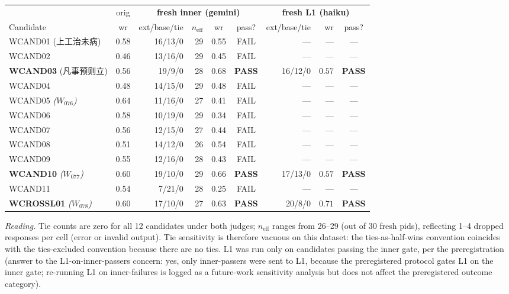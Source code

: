 \documentclass{article}
\begin{document}
\begin{CJK*}{UTF8}{gbsn}
\begin{center}\scriptsize
\begin{tabular}{l c r r c c r r c}
  \toprule
  & orig & \multicolumn{4}{c}{\textbf{fresh inner (gemini)}} & \multicolumn{3}{c}{\textbf{fresh L1 (haiku)}} \\
  \cmidrule(lr){3-6} \cmidrule(lr){7-9}
  Candidate & wr & ext/base/tie & \(n_{\text{eff}}\) & wr & pass? & ext/base/tie & wr & pass? \\
  \midrule
  WCAND01 (上工治未病)        & 0.58 & 16/13/0 & 29 & 0.55 & FAIL &  ---    & ---  & --- \\
  WCAND02                     & 0.46 & 13/16/0 & 29 & 0.45 & FAIL &  ---    & ---  & --- \\
  \textbf{WCAND03} (凡事预则立) & 0.56 & 19/9/0  & 28 & \(\mathbf{0.68}\) & \textbf{PASS} & 16/12/0 & \(\mathbf{0.57}\) & \textbf{PASS} \\
  WCAND04                     & 0.48 & 14/15/0 & 29 & 0.48 & FAIL &  ---    & ---  & --- \\
  WCAND05 \emph{(\(W_{076}\))} & 0.64 & 11/16/0 & 27 & 0.41 & FAIL &  ---    & ---  & --- \\
  WCAND06                     & 0.58 & 10/19/0 & 29 & 0.34 & FAIL &  ---    & ---  & --- \\
  WCAND07                     & 0.56 & 12/15/0 & 27 & 0.44 & FAIL &  ---    & ---  & --- \\
  WCAND08                     & 0.51 & 14/12/0 & 26 & 0.54 & FAIL &  ---    & ---  & --- \\
  WCAND09                     & 0.55 & 12/16/0 & 28 & 0.43 & FAIL &  ---    & ---  & --- \\
  \textbf{WCAND10} \emph{(\(W_{077}\))} & 0.60 & 19/10/0 & 29 & \(\mathbf{0.66}\) & \textbf{PASS} & 17/13/0 & \(\mathbf{0.57}\) & \textbf{PASS} \\
  WCAND11                     & 0.54 & 7/21/0  & 28 & 0.25 & FAIL &  ---    & ---  & --- \\
  \textbf{WCROSSL01} \emph{(\(W_{078}\))} & 0.60 & 17/10/0 & 27 & \(\mathbf{0.63}\) & \textbf{PASS} & 20/8/0 & \(\mathbf{0.71}\) & \textbf{PASS} \\
  \bottomrule
\end{tabular}
\end{center}

\noindent\emph{Reading.} Tie counts are zero for all 12 candidates
under both judges; \(n_{\text{eff}}\) ranges from 26--29
(out of 30 fresh pids), reflecting 1--4 dropped responses per cell
(error or invalid output). Tie sensitivity is therefore vacuous on
this dataset: the ties-as-half-wins convention coincides with the
ties-excluded convention because there are no ties. L1 was run
only on candidates passing the inner gate, per the preregistration
(answer to the L1-on-inner-passers concern: yes, only inner-passers were sent to L1,
because the preregistered protocol gates L1 on the inner gate;
re-running L1 on inner-failures is logged as a future-work
sensitivity analysis but does not affect the preregistered
outcome category).


\end{CJK*}
\end{document}
